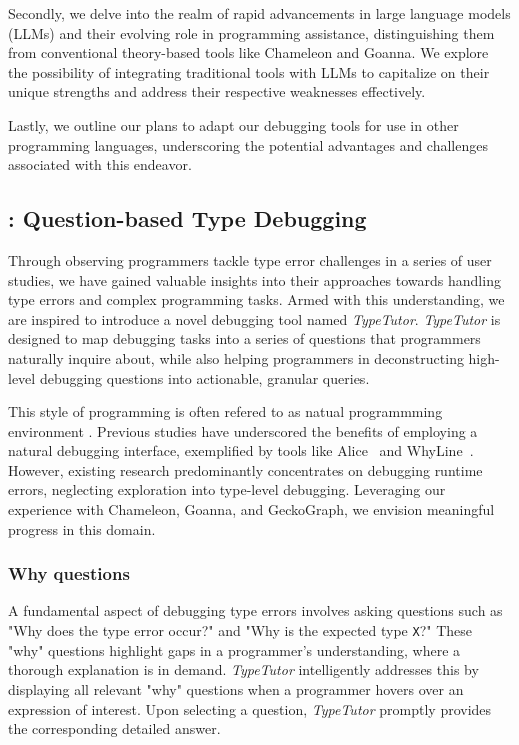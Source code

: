 Secondly, we delve into the realm of rapid advancements in large language models (LLMs) and their evolving role in programming assistance, distinguishing them from conventional theory-based tools like Chameleon and Goanna. We explore the possibility of integrating traditional tools with LLMs to capitalize on their unique strengths and address their respective weaknesses effectively.

Lastly, we outline our plans to adapt our debugging tools for use in other programming languages, underscoring the potential advantages and challenges associated with this endeavor.

\subsection{\typetutor: Question-based Type Debugging}
Through observing programmers tackle type error challenges in a series of user studies, we have gained valuable insights into their approaches towards handling type errors and complex programming tasks. Armed with this understanding, we are inspired to introduce a novel debugging tool named \textit{TypeTutor}. \textit{TypeTutor} is designed to map debugging tasks into a series of questions that programmers naturally inquire about, while also helping programmers in deconstructing high-level debugging questions into actionable, granular queries.

This style of programming is often refered to as natual programmming environment \cite{Myers2004-fy}. Previous studies have underscored the benefits of employing a natural debugging interface, exemplified by tools like Alice~\cite{Conway2000-nn} and WhyLine~\cite{Ko2009-uf}. However, existing research predominantly concentrates on debugging runtime errors, neglecting exploration into type-level debugging.  Leveraging our experience with Chameleon, Goanna, and GeckoGraph, we envision meaningful progress in this domain.


\subsubsection{Why questions}

A fundamental aspect of debugging type errors involves asking questions such as "Why does the type error occur?" and "Why is the expected type \texttt{X}?" These "why" questions highlight gaps in a programmer's understanding, where a thorough explanation is in demand. \textit{TypeTutor} intelligently addresses this by displaying all relevant "why" questions when a programmer hovers over an expression of interest. Upon selecting a question, \textit{TypeTutor} promptly provides the corresponding detailed answer.



